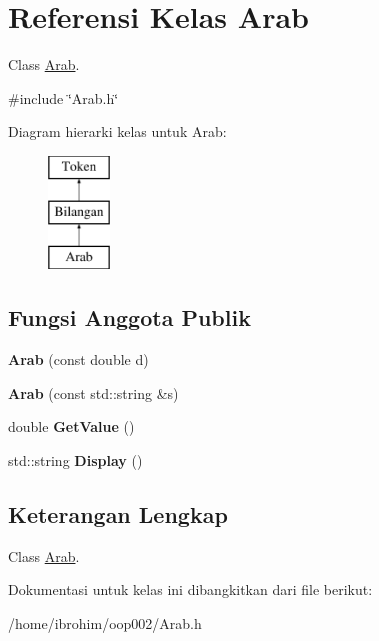 \hypertarget{classArab}{}\section{Referensi Kelas Arab}
\label{classArab}


Class \hyperlink{classArab}{Arab}.  




{\ttfamily \#include \char`\"{}Arab.\+h\char`\"{}}

Diagram hierarki kelas untuk Arab\+:\begin{figure}[H]
\begin{center}
\leavevmode
\includegraphics[height=3.000000cm]{d0/d70/classArab}
\end{center}
\end{figure}
\subsection*{Fungsi Anggota Publik}
\begin{DoxyCompactItemize}
\item 
\hypertarget{classArab_add184fe39f6fc81d20f5b26d4b9758a3}{}{\bfseries Arab} (const double d)\label{classArab_add184fe39f6fc81d20f5b26d4b9758a3}

\item 
\hypertarget{classArab_a28e10b4e58b32730dce2a4f3f98a825e}{}{\bfseries Arab} (const std\+::string \&s)\label{classArab_a28e10b4e58b32730dce2a4f3f98a825e}

\item 
\hypertarget{classArab_ac0fb43a1da728805bec9add68fd46fa0}{}double {\bfseries Get\+Value} ()\label{classArab_ac0fb43a1da728805bec9add68fd46fa0}

\item 
\hypertarget{classArab_a96e515d21840b8ddfe50414505618200}{}std\+::string {\bfseries Display} ()\label{classArab_a96e515d21840b8ddfe50414505618200}

\end{DoxyCompactItemize}


\subsection{Keterangan Lengkap}
Class \hyperlink{classArab}{Arab}. 

Dokumentasi untuk kelas ini dibangkitkan dari file berikut\+:\begin{DoxyCompactItemize}
\item 
/home/ibrohim/oop002/Arab.\+h\end{DoxyCompactItemize}

